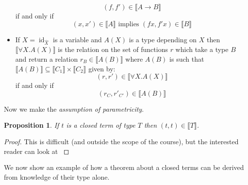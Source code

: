 \documentclass[12pt]{article}
\theoremstyle{plain}
\newtheorem{proposition}[thm]{Proposition}
\theoremstyle{definition}
\newcommand{\lto}{\longrightarrow}
\begin{document}
\begin{itemize}
			\begin{equation*}
				(f,f') \in \llbracket A \lto B \rrbracket
				\end{equation*}
			if and only if
				\begin{equation*}
				(x,x') \in \llbracket A \rrbracket\text{ implies }(fx, f'x) \in \llbracket B \rrbracket
				\end{equation*}
			\item If $X= \operatorname{id}_{\hat{X}}$ is a variable and $A(X)$ is a type depending on $X$ then $\llbracket \forall X. A(X)\rrbracket$ is the relation on the set of functions $r$ which take a type $B$ and return a relation $r_B \in \llbracket A(B) \rrbracket$ where $A(B)$ is such that $\llbracket A(B) \rrbracket \subseteq \llbracket C_1 \rrbracket \times \llbracket C_2 \rrbracket$ given by:
			\begin{equation*}
				(r,r') \in \llbracket \forall X. A(X) \rrbracket
				\end{equation*}
			if and only if
			\begin{equation*}
				(r_C, r'_{C'}) \in \llbracket A(B) \rrbracket
				\end{equation*}
			\end{itemize}
		Now we make the \emph{assumption of parametricity}.
		\begin{proposition}
			If $t$ is a closed term of type $T$ then $(t,t) \in \llbracket T \rrbracket$.
			\end{proposition}
		\begin{proof}
			This is difficult (and outside the scope of the course), but the interested reader can look at \cite{Wadler}
			\end{proof}
		
		We now show an example of how a theorem about a closed terms can be derived from knowledge of their type alone.
		
\end{document}
